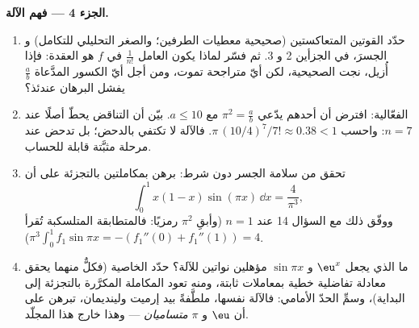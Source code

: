 \begin{problem}
\medskip
\noindent\textbf{الجزء 4 --- فهم الآلة.}
\begin{enumerate}[resume]
  \item حدّد القوتين المتعاكستين (صحيحية معطيات
        الطرفين؛ والصغر التحليلي للتكامل) و
        الجسرَ، في الجزأين 2 و 3. ثم فسّر لماذا يكون العامل
        $\frac{1}{n!}$ في $f$ هو العقدة: فإذا أُزيل،
        نجت الصحيحية، لكن أيّ متراجحة تموت، ومن أجل
        أيّ الكسور المدَّعاة $\frac ab$ يفشل البرهان عندئذ؟
  \item الفعّالية: افترض أن أحدهم يدّعي $\pi^2 = \frac ab$
        مع $a \leq 10$. بيّن أن التناقض يحطّ أصلًا
        عند $n = 7$: واحسب $\pi\,(10/4)^7/7! \approx
        0.38 < 1$. فالآلة لا تكتفي بالدحض؛ بل
        تدحض عند مرحلة مثبَّتة قابلة للحساب.
  \item تحقق من سلامة الجسر دون شرط: برهن بمكاملتين
        بالتجزئة على أن
        \[
        \int_0^1 x(1 - x)\sin(\pi x)\,\dd x = \frac{4}{\pi^3},
        \]
        ووفّق ذلك مع السؤال 14 عند $n = 1$ (وأبقِ
        $\pi^2$ رمزيًا: فالمتطابقة المتلسكبة تُقرأ $\pi^3
        \int_0^1 f_1 \sin \pi x = -(f_1''(0) + f_1''(1)) = 4$).
  \item ما الذي يجعل $\eu^x$ و $\sin \pi x$ مؤهلين نواتين
        للآلة؟ حدّد الخاصية (فكلٌّ منهما يحقق
        معادلة تفاضلية خطية بمعاملات
        ثابتة، ومنه تعود المكاملة المكرَّرة بالتجزئة
        إلى البداية)، وسمِّ الحدّ الأمامي: فالآلة نفسها،
        ملطَّفةً بيد إرميت ولينديمان، تبرهن على أن $\eu$
        و $\pi$ \emph{متساميان} --- وهذا خارج هذا المجلّد.
\end{enumerate}


\end{problem}

